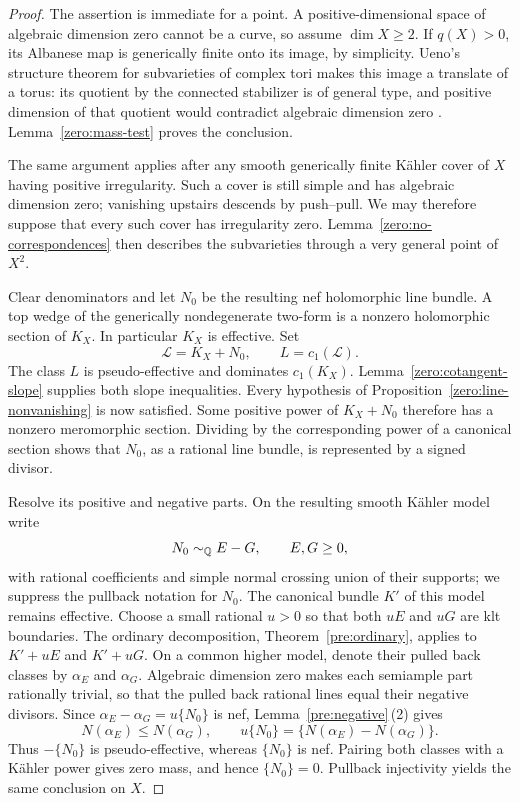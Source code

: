 \begin{proof}
The assertion is immediate for a point.  A positive-dimensional space
of algebraic dimension zero cannot be a curve, so assume \(\dim X\ge2\).
If \(q(X)>0\), its Albanese map is generically finite onto its image,
by simplicity.  Ueno's structure theorem for subvarieties of complex
tori makes this image a translate of a torus: its quotient by the
connected stabilizer is of general type, and positive dimension of that
quotient would contradict algebraic dimension zero \cite{Ueno}.
Lemma~\ref{zero:mass-test} proves the conclusion.

The same argument applies after any smooth generically finite Kähler
cover of \(X\) having positive irregularity.  Such a cover is still
simple and has algebraic dimension zero; vanishing upstairs descends
by push--pull.  We may therefore suppose that every such cover has
irregularity zero.  Lemma~\ref{zero:no-correspondences} then describes
the subvarieties through a very general point of \(X^2\).

Clear denominators and let \(N_0\) be the resulting nef holomorphic line
bundle.  A top wedge of the generically nondegenerate two-form is a
nonzero holomorphic section of \(K_X\).  In particular \(K_X\) is
effective.  Set
\[
 \mathscr L=K_X+N_0,\qquad L=c_1(\mathscr L).
\]
The class \(L\) is pseudo-effective and dominates \(c_1(K_X)\).
Lemma~\ref{zero:cotangent-slope} supplies both slope inequalities.
Every hypothesis of Proposition~\ref{zero:line-nonvanishing} is now
satisfied.  Some positive power of \(K_X+N_0\) therefore has a nonzero
meromorphic section.  Dividing by the corresponding power of a
canonical section shows that \(N_0\), as a rational line bundle, is
represented by a signed divisor.

Resolve its positive and negative parts.  On the resulting smooth
Kähler model write
\[
 N_0\sim_{\mathbb Q} E-G,\qquad E,G\ge0,
\]
with rational coefficients and simple normal crossing union of their
supports; we suppress the pullback notation for \(N_0\).  The canonical
bundle \(K'\) of this model remains effective.  Choose a small rational
\(u>0\) so that both \(uE\) and \(uG\) are klt boundaries.
The ordinary decomposition, Theorem~\ref{pre:ordinary}, applies to
\(K'+uE\) and \(K'+uG\).  On a common higher model, denote their pulled
back classes by \(\alpha_E\) and \(\alpha_G\).  Algebraic dimension zero
makes each semiample part rationally trivial, so that the pulled back
rational lines equal their negative divisors.  Since
\(\alpha_E-\alpha_G=u\{N_0\}\) is nef,
Lemma~\ref{pre:negative}\,(2) gives
\[
 N(\alpha_E)\le N(\alpha_G),\qquad
 u\{N_0\}=\{N(\alpha_E)-N(\alpha_G)\}.
\]
Thus \(-\{N_0\}\) is pseudo-effective, whereas \(\{N_0\}\) is nef.
Pairing both classes with a Kähler power gives zero mass, and hence
\(\{N_0\}=0\).  Pullback injectivity yields the same conclusion on
\(X\).
\end{proof}

